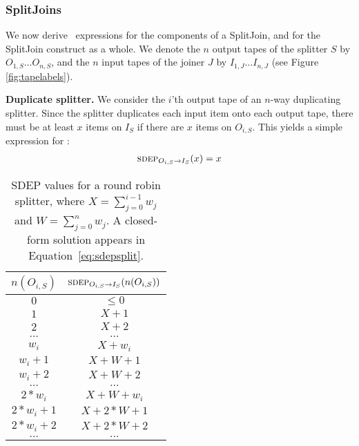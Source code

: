 \subsubsection{SplitJoins}
\label{sec:timesj}

We now derive \sdep~expressions for the components of a SplitJoin, and
for the SplitJoin construct as a whole.  We denote the $n$ output
tapes of the splitter $S$ by $O_{1,S} \dots O_{n,S}$, and the $n$
input tapes of the joiner $J$ by $I_{1,J} \dots I_{n,J}$ (see Figure
\ref{fig:tapelabels}).

{\bf Duplicate splitter.}  We consider the $i$'th output tape of an
$n$-way duplicating splitter.  Since the splitter duplicates each
input item onto each output tape, there must be at least $x$ items on
$I_S$ if there are $x$ items on $O_{i,S}$.  This yields a simple
expression for \sdep:
\begin{align*}
\mi{I_S}{O_{i,S}}(x) = x
\end{align*}

\begin{table}[t]
\begin{center}
\scriptsize
\begin{tabular}{|c|c|} \hline
$n(O_{i,S})$ & $\mi{I_S}{O_{i,S}}(n(O_{i,S}))$ \\
\hline \hline
$0$  & $\le 0$ \\ \hline
$1$  & $X + 1$ \\ \hline
$2$  & $X + 2$ \\ \hline
$\dots$ & $\dots$ \\ \hline
$w_i$ & $X + w_i$ \\ \hline
$w_i + 1$ & $X + W + 1$ \\ \hline
$w_i + 2$ & $X + W + 2$ \\ \hline
$\dots$ & $\dots$ \\ \hline
$2 * w_i$ & $X + W + w_i$ \\ \hline
$2 * w_i + 1$ & $X + 2*W + 1$ \\ \hline
$2 * w_i + 2$ & $X + 2*W + 2$ \\ \hline
$\dots$ & $\dots$ \\ \hline
\end{tabular}
\vspace{-6pt}
\caption{\protect\small SDEP values for a round robin splitter, where
$X = \sum_{j=0}^{i-1} w_j$ and $W = \sum_{j=0}^n w_j$.  A closed-form
solution appears in Equation~\ref{eq:sdepsplit}.
\label{tab:sdepsplit}}
\vspace{-12pt}
\end{center}
\end{table}

